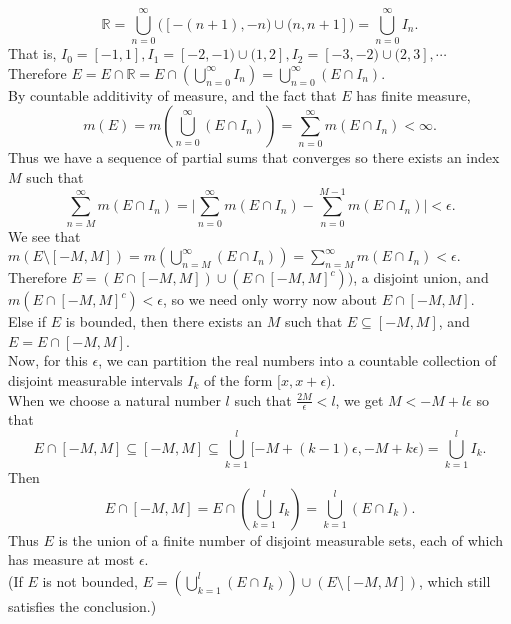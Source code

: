 \begin{enumerate}
\[		\mathbb{R}=\bigcup_{n=0}^\infty\biggl([-(n+1),-n)\cup(n,n+1]\biggr)=\bigcup_{n=0}^\infty I_n.
	\]
	That is, $I_0=[-1,1],I_1=[-2,-1)\cup(1,2],I_2=[-3,-2)\cup(2,3],\cdots$\\
	Therefore $E=E\cap\mathbb{R}=E\cap(\bigcup_{n=0}^\infty I_n)=\bigcup_{n=0}^\infty (E\cap I_n)$.\\
	By countable additivity of measure, and the fact that $E$ has finite measure,
	\[
		m(E)=m(\bigcup_{n=0}^\infty (E\cap I_n))=\sum_{n=0}^\infty m(E\cap I_n)<\infty.
	\]
	Thus we have a sequence of partial sums that converges so there exists an index $M$ such that 
	\[
		\sum_{n=M}^\infty m(E\cap I_n)=\biggl|\sum_{n=0}^\infty m(E\cap I_n)-\sum_{n=0}^{M-1} m(E\cap I_n)\biggr|<\epsilon.
	\]
	We see that $m(E\setminus[-M,M]) = m(\bigcup_{n=M}^\infty (E\cap I_n))=\sum_{n=M}^\infty m(E\cap I_n)<\epsilon$.
	\\
	Therefore $E=(E\cap[-M,M])\cup(E\cap[-M,M]^c))$, a disjoint union, and $m(E\cap[-M,M]^c)<\epsilon$, so we need only worry now about $E\cap[-M,M]$.\\
	Else if $E$ is bounded, then there exists an $M$ such that $E\subseteq[-M,M]$, and $E=E\cap[-M,M]$.\\
    Now, for this $\epsilon$, we can partition the real numbers into a countable collection of disjoint measurable intervals $I_k$ of the form $[x,x+\epsilon)$.\\
	When we choose a natural number $l$ such that $\frac{2M}{\epsilon}<l$, we get $M<-M+l\epsilon$ so that 
	\[
		E\cap[-M,M]\subseteq [-M,M]\subseteq\bigcup_{k=1}^l[-M+(k-1)\epsilon,-M+k\epsilon)=\bigcup_{k=1}^l I_k.
	\]
	Then 
	\[
		E\cap[-M,M]=E \cap (\bigcup_{k=1}^l I_k) = \bigcup_{k=1}^l (E \cap I_k).
	\]
	Thus $E$ is the union of a finite number of disjoint measurable sets, each of which has measure at most $\epsilon$.\\
	(If $E$ is not bounded, $E=(\bigcup_{k=1}^l (E \cap I_k))\cup(E\setminus[-M,M])$, which still satisfies the conclusion.)
\end{enumerate}

